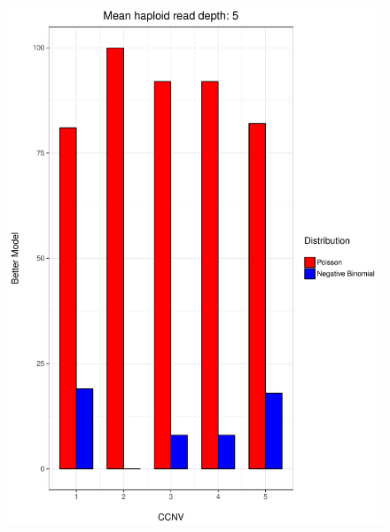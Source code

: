 \documentclass[11pt]{article}
\begin{document}
\begin{figure}
\begin{center}
\includegraphics[scale=0.28]{../Results/Second_Analysis/Better_model_bar5.pdf}

\end{center}
\end{figure}
\end{document}
